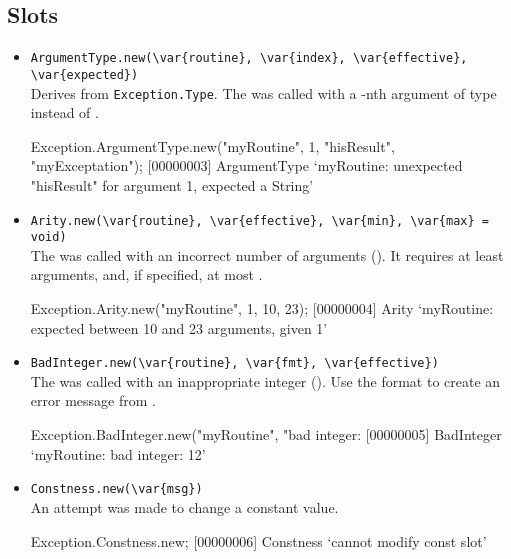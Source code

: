 \subsection{Slots}
\begin{itemize}
\item \lstinline|ArgumentType.new(\var{routine}, \var{index}, \var{effective}, \var{expected})|\\
  Derives from \lstinline|Exception.Type|.  The  was
  called with a -nth argument of type 
  instead of .
\begin{urbiscript}[firstnumber=last]
Exception.ArgumentType.new("myRoutine", 1, "hisResult", "myExceptation");
[00000003] ArgumentType `myRoutine: unexpected "hisResult" for argument 1, expected a String'
\end{urbiscript}

\item \lstinline|Arity.new(\var{routine}, \var{effective}, \var{min}, \var{max} = void)|\\
  The  was called with an incorrect number of arguments
  ().  It requires at least  arguments, and,
  if specified, at most .
\begin{urbiscript}[firstnumber=last]
Exception.Arity.new("myRoutine", 1, 10, 23);
[00000004] Arity `myRoutine: expected between 10 and 23 arguments, given 1'
\end{urbiscript}

\item \lstinline|BadInteger.new(\var{routine}, \var{fmt}, \var{effective})|\\
  The  was called with an inappropriate integer
  ().  Use the format  to create an error
  message from .
\begin{urbiscript}[firstnumber=last]
Exception.BadInteger.new("myRoutine", "bad integer: %
[00000005] BadInteger `myRoutine: bad integer: 12'
\end{urbiscript}

\item \lstinline|Constness.new(\var{msg})|\\
  An attempt was made to change a constant value.
\begin{urbiscript}[firstnumber=last]
Exception.Constness.new;
[00000006] Constness `cannot modify const slot'
\end{urbiscript}


\end{itemize}
